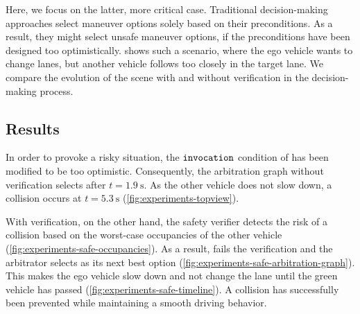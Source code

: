 Here, we focus on the latter, more critical case.
Traditional decision-making approaches select maneuver options solely based on their preconditions.
As a result, they might select unsafe maneuver options,
if the preconditions have been designed too optimistically.
%
 shows such a scenario, where the ego vehicle wants to change lanes,
but another vehicle follows too closely in the target lane.
We compare the evolution of the scene with and without verification in the decision-making process.


\subsection{Results}



In order to provoke a risky situation,
the $\texttt{invocation}$ condition of  has been modified to be too optimistic.
Consequently, the arbitration graph without verification selects  after $t=\SI{1.9}{\second}$.
As the other vehicle does not slow down, a collision occurs at $t=\SI{5.3}{\second}$ (\cref{fig:experiments-topview}).

With verification, on the other hand, the safety verifier detects the risk of a collision based on the worst-case occupancies of the other vehicle (\cref{fig:experiments-safe-occupancies}).
As a result,  fails the verification and
the  arbitrator selects 
as its next best option (\cref{fig:experiments-safe-arbitration-graph}).
This makes the ego vehicle slow down and not change the lane
until the green vehicle has passed (\cref{fig:experiments-safe-timeline}).
A collision has successfully been prevented
while maintaining a smooth driving behavior.
